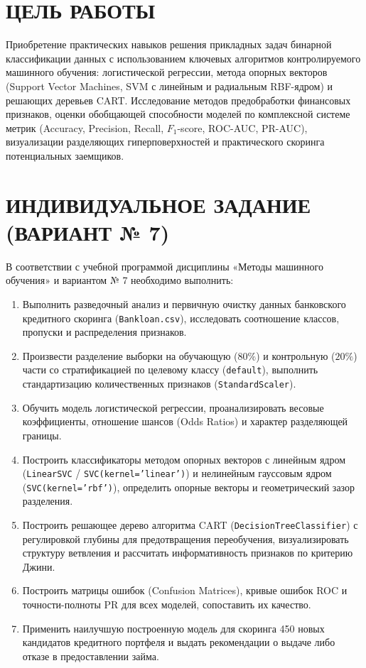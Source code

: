 \documentclass[14pt,a4paper]{extarticle}
\begin{document}
\section*{ЦЕЛЬ РАБОТЫ}

Приобретение практических навыков решения прикладных задач бинарной классификации данных с использованием ключевых алгоритмов контролируемого машинного обучения: логистической регрессии, метода опорных векторов (Support Vector Machines, SVM с линейным и радиальным RBF-ядром) и решающих деревьев CART. Исследование методов предобработки финансовых признаков, оценки обобщающей способности моделей по комплексной системе метрик (Accuracy, Precision, Recall, $F_1$-score, ROC-AUC, PR-AUC), визуализации разделяющих гиперповерхностей и практического скоринга потенциальных заемщиков.

\section*{ИНДИВИДУАЛЬНОЕ ЗАДАНИЕ (ВАРИАНТ № 7)}

В соответствии с учебной программой дисциплины «Методы машинного обучения» и вариантом № 7 необходимо выполнить:
\begin{enumerate}
  \item Выполнить разведочный анализ и первичную очистку данных банковского кредитного скоринга (\texttt{Bankloan.csv}), исследовать соотношение классов, пропуски и распределения признаков.
  \item Произвести разделение выборки на обучающую ($80\%$) и контрольную ($20\%$) части со стратификацией по целевому классу (\texttt{default}), выполнить стандартизацию количественных признаков (\texttt{StandardScaler}).
  \item Обучить модель логистической регрессии, проанализировать весовые коэффициенты, отношение шансов (Odds Ratios) и характер разделяющей границы.
  \item Построить классификаторы методом опорных векторов с линейным ядром (\texttt{LinearSVC} / \texttt{SVC(kernel='linear')}) и нелинейным гауссовым ядром (\texttt{SVC(kernel='rbf')}), определить опорные векторы и геометрический зазор разделения.
  \item Построить решающее дерево алгоритма CART (\texttt{DecisionTreeClassifier}) с регулировкой глубины для предотвращения переобучения, визуализировать структуру ветвления и рассчитать информативность признаков по критерию Джини.
  \item Построить матрицы ошибок (Confusion Matrices), кривые ошибок ROC и точности-полноты PR для всех моделей, сопоставить их качество.
  \item Применить наилучшую построенную модель для скоринга 450 новых кандидатов кредитного портфеля и выдать рекомендации о выдаче либо отказе в предоставлении займа.
\end{enumerate}
\end{document}
